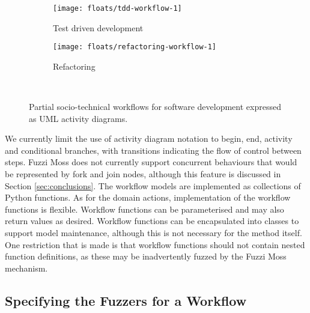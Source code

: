\documentclass{sig-alternate}
\begin{document}
\begin{figure*}
  \centering

  \begin{subfigure}[b]{.45\linewidth}
    \centering
    \texttt{[image: floats/tdd-workflow-1]}

    \caption{Test driven development}
    \label{fig:workflow-tdd}
  \end{subfigure}
  \begin{subfigure}[b]{.45\linewidth}
    \centering
    \texttt{[image: floats/refactoring-workflow-1]}
    
    \caption{Refactoring}
    \label{fig:workflow-refactoring}
  \end{subfigure}
  
\

  \caption{Partial socio-technical workflows for software development expressed
    as UML activity diagrams.}

  \label{fig:workflow-partial}
\end{figure*}

We currently limit the use of activity diagram notation to begin, end, activity
and conditional branches, with transitions indicating the flow of control
between steps.  Fuzzi Moss does not currently support concurrent behaviours that
would be represented by fork and join nodes, although this feature is discussed
in Section \ref{sec:conclusions}.  The workflow models are implemented as
collections of Python functions.  As for the domain actions, implementation of
the workflow functions is flexible. Workflow functions can be parameterised
and may also return values as desired.  Workflow functions can be encapsulated
into classes to support model maintenance, although this is not necessary for
the method itself.  One restriction that is made is that workflow functions
should not contain nested function definitions, as these may be inadvertently
fuzzed by the Fuzzi Moss mechanism.


\subsection{Specifying the Fuzzers for a Workflow}

\end{document}
